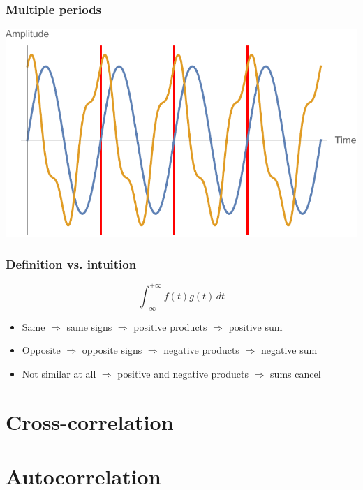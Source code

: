 \documentclass[aspectratio=169]{beamer}
\begin{document}
\begin{frame}
  \frametitle{Multiple periods}

  \centering
  \includegraphics[width=\textwidth / 2]{7 multiple periods.pdf}

\end{frame}

\begin{frame}
  \frametitle{Definition vs. intuition}

  \[\int_{-\infty}^{+\infty} f(t) g(t) \,dt\]

  \begin{itemize}
    \item<2-> Same $\Rightarrow$ same signs $\Rightarrow$ positive products $\Rightarrow$ positive sum
    \item<3-> Opposite $\Rightarrow$ opposite signs $\Rightarrow$ negative products $\Rightarrow$ negative sum
    \item<4-> Not similar at all $\Rightarrow$ positive and negative products $\Rightarrow$ sums cancel
  \end{itemize}
\end{frame}

\section{Cross-correlation}

\section{Autocorrelation}
\end{document}
